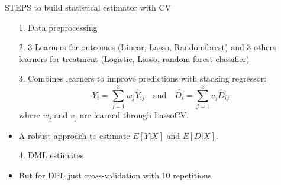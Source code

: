 \documentclass[aspectratio=169]{beamer}
\begin{document}
\begin{frame}{STEPS to build statistical estimator with CV}

\begin{itemize}
    \item[1.] Data preprocessing

    \item[2.] 3 Learners for outcomes (Linear, Lasso, Randomforest) and 3 others learners for treatment (Logistic, Lasso, random forest classifier)
    \item[3.] Combines learners to improve predictions with stacking regressor: \[         \hat{Y_i} = \sum_{j=1}^{3} w_j \hat{Y}_{ij}      \text{  }  \text{ and } \text{  }  \hat{D_i} = \sum_{j=1}^{3} v_j \hat{D}_{ij}         \] 
    where \( w_j \)  and \( v_j \) are learned through LassoCV.
        \item A robust approach to estimate \( E[Y|X] \) and \( E[D|X] \).
    \item[4.] DML estimates 
    \item But for DPL just cross-validation with 10 repetitions
\end{itemize}
    
\end{frame}
\end{document}
